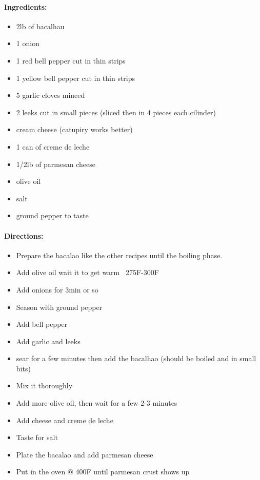 \documentclass{article}
\begin{document}
\paragraph{Ingredients:}
\begin{itemize}
    \item 2lb of bacalhau
    \item 1 onion
    \item 1 red bell pepper cut in thin strips
    \item 1 yellow bell pepper cut in thin strips
    \item 5 garlic cloves minced
    \item 2 leeks cut in small pieces (sliced then in 4 pieces each cilinder)
    \item cream cheese (catupiry works better)
    \item 1 can of creme de leche
    \item 1/2lb of parmesan cheese
    \item olive oil
    \item salt
    \item ground pepper to taste
\end{itemize}

\paragraph{Directions:}
\begin{itemize}
    \item Prepare the bacalao like the other recipes until the boiling phase.
    \item Add olive oil wait it to get warm ~275F-300F
    \item Add onions for 3min or so
    \item Season with ground pepper
    \item Add bell pepper
    \item Add garlic and leeks
    \item sear for a few minutes then add the bacalhao (should be boiled and in small bits)
    \item Mix it thoroughly
    \item Add more olive oil, then wait for a few 2-3 minutes
    \item Add cheese and creme de leche
    \item Taste for salt
    \item Plate the bacalao and add parmesan cheese
    \item Put in the oven @ 400F until parmesan crust shows up
\end{itemize}
\end{document}

